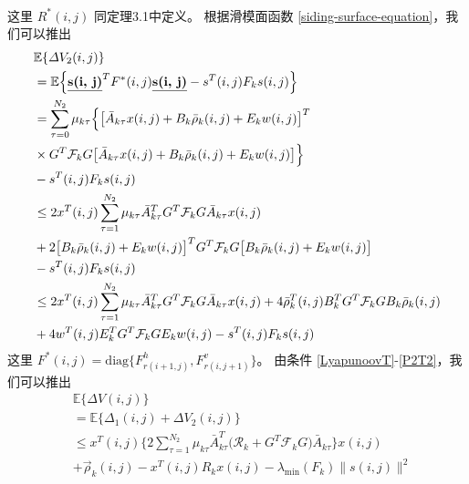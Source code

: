 \begin{equation}
\begin{split}
	\end{split}
	\end{equation}
	这里 $R^{*}(i,j)$ 同定理3.1中定义。
	根据滑模面函数 \eqref{siding-surface-equation}，我们可以推出
	\begin{equation} \label{P2T2}
	\begin{split}
	&\mathbb{E}\{\varDelta V_{2}(i,j) \}\\
	&=\mathbb{E}\Big\{\emph{\textbf{s(i, j)}}^{T}F^{*}(i,j)\emph{\textbf{s(i, j)}} - s^{T}(i,j)F_{k}s(i,j)\Big\}\\
	&=  \sum_{\tau =0}^{N_{2}}\mu_{k\tau }\Big\{\big[\bar{A}_{k\tau }x(i,j)+B_{k}\bar{\rho}_{k}(i,j)+E_{k}w(i,j)\big]^{T}\\ &\times G^{T}\mathcal{F}_{k} G\big[ \bar{A}_{k\tau }x(i,j)+B_{k}\bar{\rho}_{k}(i,j)+E_{k}w(i,j)\big]\Big\}\\
	&-s^{T}(i,j)F_{k}s(i,j)\\
	&\leq 2x^{T}(i,j)\sum_{\tau =1}^{N_{2}}\mu_{k\tau }\bar{A}^{T}_{k\tau }G^{T}\mathcal{F}_{k}G\bar{A}_{k\tau }x(i,j) \\
	&+2\big[B_{k}\bar{\rho}_{k}(i,j)+E_{k}w(i,j)\big]^{T}G^{T}\mathcal{F}_{k}  G\big[B_{k}\bar{\rho}_{k}(i,j)+E_{k}w(i,j)\big]\\
	&-s^{T}(i,j)F_{k}s(i,j)\\
	&\leq 2x^{T}(i,j)\sum_{\tau =1}^{N_{2}}\mu_{k\tau }\bar{A}^{T}_{k\tau }G^{T}\mathcal{F}_{k}G\bar{A}_{k\tau }x(i,j) 
	+ 4\bar{\rho}^{T}_{k}(i,j)B^{T}_{k}G^{T}\mathcal{F}_{k}GB_{k}\bar{\rho}_{k}(i,j)\\
	&+4w^{T}(i,j)E^{T}_{k}G^{T}\mathcal{F}_{k}GE_{k}w(i,j)
	-s^{T}(i,j)F_{k}s(i,j)
	\end{split}
	\end{equation}
	这里 $F^{*}(i,j)=\mathrm{diag}\{F^{h}_{r(i+1,j)},F^{v}_{r(i,j+1)}\}$。
	由条件 \eqref{LyapunoovT}-\eqref{P2T2}，我们可以推出
	\begin{equation}\label{P2T3}
	\begin{split}
	&\mathbb{E}\{\varDelta V(i,j) \}\\
	&= \mathbb{E}\Big\{\varDelta_{1}(i,j)+\varDelta V_{2}(i,j) \Big\}\\
	&\leq x^{T}(i,j)\Big\{ 2\sum_{\tau =1}^{N_{2}}\mu_{k\tau }\bar{A}^{T}_{k\tau }\big(\mathcal{R}_{k} +G^{T}\mathcal{F}_{k}G\big)\bar{A}_{k\tau } \Big\} x(i,j) \\
	& +\vec{\rho}_{k}(i,j)-x^{T}(i,j)R_{k}x(i,j) - \lambda_{\mathrm{min}}(F_{k})\|s(i,j)\|^{2}\\
	\end{split}
	\end{equation}
